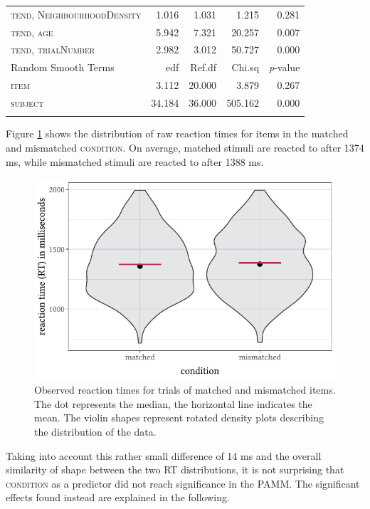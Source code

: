 \begin{table}
\begin{tabular}{lrrrr}
\textsc{tend,
  NeighbourhoodDensity} & 1.016    & 1.031  & 1.215    & 0.281             \\
\textsc{tend,
  age}                  & 5.942    & 7.321  & 20.257   & 0.007             \\
\textsc{tend,
  trialNumber}          & 2.982    & 3.012  & 50.727   & 0.000             \\ 
\midrule
Random Smooth Terms          & edf      & Ref.df & Chi.sq   & \textit{p}-value  \\ 
\midrule
\textsc{item}                         & 3.112    & 20.000 & 3.879    & 0.267             \\
\textsc{subject}                      & 34.184   & 36.000 & 505.162  & 0.000             \\
\lspbottomrule
\end{tabular}
\end{table}

Figure \ref{fig:7_3} shows the distribution of raw reaction times for items in the matched and mismatched \textsc{condition}. On average, matched stimuli are reacted to after 1374 ms, while mismatched stimuli are reacted to after 1388 ms. 

\begin{figure}
    \centering
    \includegraphics[]{figures/fig7.3.pdf}
    \caption{Observed reaction times for trials of matched and mismatched items. The dot represents the median, the horizontal line indicates the mean. The violin shapes represent rotated density plots describing the distribution of the data.}
    \label{fig:7_3}
\end{figure}

Taking into account this rather small difference of 14 ms and the overall similarity of shape between the two RT distributions, it is not surprising that \textsc{condition} as a predictor did not reach significance in the PAMM. The significant effects found instead are explained in the following.

